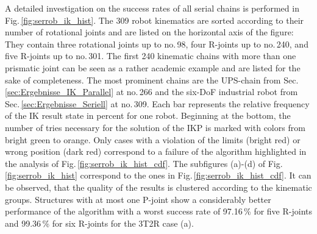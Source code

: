 \documentclass[robotics,article,submit,moreauthors,pdftex]{Definitions/mdpi}
\begin{document}
A detailed investigation on the success rates of all serial chains is performed in Fig.\,\ref{fig:serrob_ik_hist}.
The 309 robot kinematics are sorted according to their number of rotational joints and are listed on the horizontal axis of the figure: They contain three rotational joints up to no.\,98, four R-joints up to no.\,240, and five R-joints up to no.\,301.
The first 240 kinematic chains with more than one prismatic joint can be seen as a rather academic example and are listed for the sake of completeness.
The most prominent chains are the UPS-chain from Sec.\,\ref{sec:Ergebnisse_IK_Parallel} at no.\,266 and the six-DoF industrial robot from Sec.\,\ref{sec:Ergebnisse_Seriell} at no.\,309.
Each bar represents the relative frequency of the IK result state in percent for one robot. 
Beginning at the bottom, the number of tries necessary for the solution of the IKP is marked with colors from bright green to orange.
Only cases with a violation of the limits (bright red) or wrong position (dark red) correspond to a failure of the algorithm highlighted in the analysis of Fig.\,\ref{fig:serrob_ik_hist_cdf}.
The subfigures (a)-(d) of Fig.\,\ref{fig:serrob_ik_hist} correspond to the ones in Fig.\,\ref{fig:serrob_ik_hist_cdf}.
It can be observed, that the quality of the results is clustered according to the kinematic groups.
Structures with at most one P-joint show a considerably better performance of the algorithm with a worst success rate of 97.16\,\% for five R-joints %
and 99.36\,\% for six R-joints %
for the 3T2R case (a).
\end{document}
